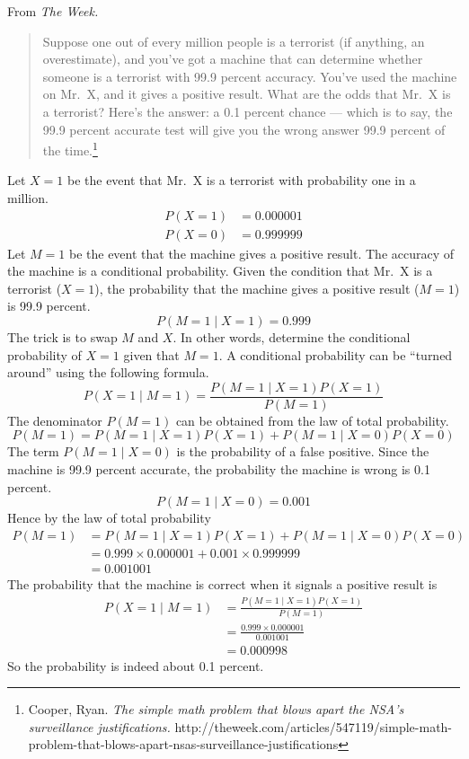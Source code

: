 \documentclass[12pt]{article}
\begin{document}
From {\it The Week.}
\begin{quote}
Suppose one out of every million people is a terrorist
(if anything, an overestimate), and you've got a machine
that can determine whether someone is a terrorist with 99.9 percent accuracy.
You've used the machine on Mr.~X, and it gives a positive result.
What are the odds that Mr.~X is a terrorist?
Here's the answer: a 0.1 percent chance --- which is to say,
the 99.9 percent accurate test will give you the wrong answer 99.9
percent of the time.\footnote{
Cooper, Ryan.
{\it The simple math problem that blows apart the NSA's surveillance justifications.}
http://theweek.com/articles/547119/simple-math-problem-that-blows-apart-nsas-surveillance-justifications}
\end{quote}

Let $X=1$ be the event that Mr.~X is a terrorist with probability
one in a million.
\begin{align*}
P(X{=}1)&=0.000001\\
P(X{=}0)&=0.999999
\end{align*}
Let $M=1$ be the event that the machine gives a positive result.
The accuracy of the machine is a conditional probability.
Given the condition that Mr.~X is a terrorist ($X=1$),
the probability that the machine gives a positive result ($M=1$)
is 99.9 percent.
\[
P(M{=}1\mid X{=}1)=0.999
\]
The trick is to swap $M$ and $X$.
In other words, determine the conditional probability of $X=1$ given that $M=1$.
A conditional probability can be ``turned around'' using the following formula.
\[
P(X{=}1\mid M{=1})=\frac{P(M{=}1\mid X{=}1)P(X{=}1)}{P(M{=}1)}
\]
The denominator $P(M{=}1)$ can be obtained from the law of total probability.
\[
P(M{=}1)=P(M{=}1\mid X{=}1)P(X{=}1)+P(M{=}1\mid X{=}0)P(X{=}0)
\]
The term $P(M{=}1\mid X{=}0)$ is the probability of a false positive.
Since the machine is 99.9 percent accurate,
the probability the machine is wrong is 0.1 percent.
\[
P(M{=}1\mid X{=}0)=0.001
\]
Hence by the law of total probability
\begin{align*}
P(M{=}1)
&=P(M{=}1\mid X{=}1)P(X{=}1)+P(M{=}1\mid X{=}0)P(X{=}0)\\
&=0.999\times0.000001+0.001\times0.999999\\
&=0.001001
\end{align*}
The probability that the machine is correct when it signals a positive result is
\begin{align*}
P(X{=}1\mid M{=1})
&=\frac{P(M{=}1\mid X{=}1)P(X{=}1)}{P(M{=}1)}\\
&=\frac{0.999\times0.000001}{0.001001}\\
&=0.000998
\end{align*}
So the probability is indeed about 0.1 percent.
\end{document}
